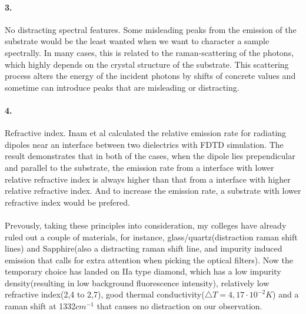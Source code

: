 \paragraph{3.} No distracting spectral features.
Some misleading peaks from the emission of the substrate would be the least wanted when we want to character a sample spectrally. In many cases, this is related to the raman-scattering of the photons, which highly depends on the crystal structure of the substrate. This scattering process alters the energy of the incident photons by shifts of concrete values and sometime can introduce peaks that are misleading or distracting.
\paragraph{4.}Refractive index. Inam et al calculated the relative emission rate for radiating dipoles near an interface between two dielectrics with FDTD simulation. The result demonstrates that in both of the cases, when the dipole lies prependicular and parallel to the substrate, the emission rate from a interface with lower relative refractive index is always higher than that from a interface with higher relative refractive index. And to increase the emission rate, a substrate with lower refractive index would be prefered.
\paragraph{}Prevously, taking these principles into consideration, my colleges have already ruled out a couple of materials, for instance, glass/quartz(distraction raman shift lines) and Sapphire(also a distracting raman shift line, and impurity induced emission that calls for extra attention when picking the optical filters). Now the temporary choice has landed on IIa type diamond, which has a low impurity density(resulting in low background fluorescence intensity), relatively low refractive index(2,4 to 2,7), good thermal conductivity($\bigtriangleup T = 4,17 \cdot 10^{-2}K$) and a raman shift at 1332$cm^{-1} $ that causes no distraction on our observation.

